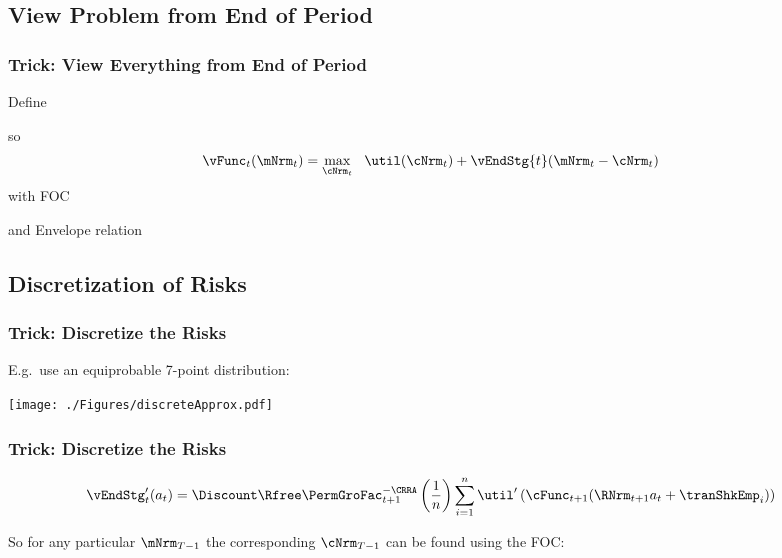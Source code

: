 \documentclass{beamer}
\begin{document}
\subsection{View Problem from End of Period}

\begin{frame}[label=Normalize]
\frametitle{Trick: View Everything from End of Period}

Define 

so 
\begin{equation}\begin{gathered}\begin{aligned}
  \vFunc_{t}(\mNrm_{t})  & = \max_{\cNrm_{t}}~~ \util(\cNrm_{t}) + \vEndStg{t}(\mNrm_{t}-\cNrm_{t})
\end{aligned}\end{gathered}\end{equation}
with FOC

and Envelope relation


\end{frame}


\subsection{Discretization of Risks}
\begin{frame}[label=DiscretizeFig]
\frametitle{Trick: Discretize the Risks}

E.g.\ use an equiprobable 7-point distribution:\medskip\medskip

\texttt{[image: ./Figures/discreteApprox.pdf]}

\end{frame}

\begin{frame}[label=DiscretizeEqn]
\frametitle{Trick: Discretize the Risks}

\begin{equation}\begin{gathered}\begin{aligned}
        \vEndStg_{t}^{\prime}(a_{t})  & =  \Discount \Rfree \PermGroFac_{t+1}^{-\CRRA} \left(\frac{1}{n}\right) \sum_{i=1}^{n} \util^{\prime}\left(\cFunc_{t+1}(\RNrm_{t+1} a_{t} + \tranShkEmp_{i})\right)
\end{aligned}\end{gathered}\end{equation}

%

\pause 
So for any particular $\mNrm_{T-1}$ the corresponding $\cNrm_{T-1}$ can be found
using the FOC:



\end{frame}
\end{document}
